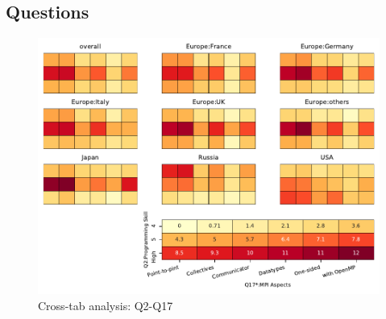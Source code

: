
\subsection{Questions}


\begin{figure}
\begin{center}
\includegraphics[width=12cm]{../pdfs/Q2-Q17.pdf}
\caption{Cross-tab analysis: Q2-Q17}
\label{fig:Q2-Q17}
\end{center}
\end{figure}
